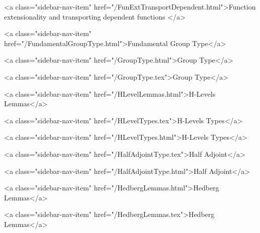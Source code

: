           <a class="sidebar-nav-item" href="/FunExtTransportDependent.html">Function extensionality and transporting dependent functions </a>
        
      
    
      
        
          <a class="sidebar-nav-item" href="/FundamentalGroupType.html">Fundamental Group Type</a>
        
      
    
      
        
          <a class="sidebar-nav-item" href="/GroupType.html">Group Type</a>
        
      
    
      
        
          <a class="sidebar-nav-item" href="/GroupType.tex">Group Type</a>
        
      
    
      
        
          <a class="sidebar-nav-item" href="/HLevelLemmas.html">H-Levels Lemmas</a>
        
      
    
      
        
          <a class="sidebar-nav-item" href="/HLevelTypes.tex">H-Levels Types</a>
        
      
    
      
        
          <a class="sidebar-nav-item" href="/HLevelTypes.html">H-Levels Types</a>
        
      
    
      
        
          <a class="sidebar-nav-item" href="/HalfAdjointType.tex">Half Adjoint</a>
        
      
    
      
        
          <a class="sidebar-nav-item" href="/HalfAdjointType.html">Half Adjoint</a>
        
      
    
      
        
          <a class="sidebar-nav-item" href="/HedbergLemmas.html">Hedberg Lemmas</a>
        
      
    
      
        
          <a class="sidebar-nav-item" href="/HedbergLemmas.tex">Hedberg Lemmas</a>
        
      
    

